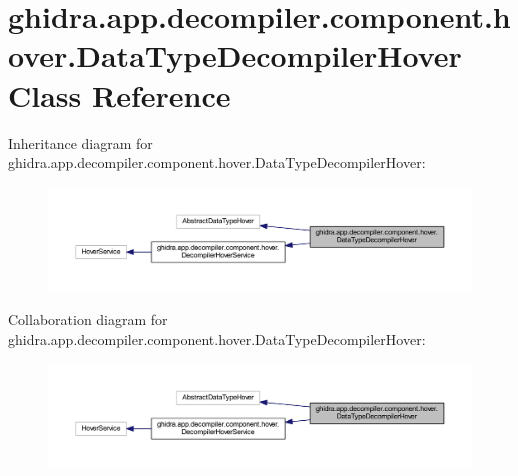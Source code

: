 \hypertarget{classghidra_1_1app_1_1decompiler_1_1component_1_1hover_1_1_data_type_decompiler_hover}{}\section{ghidra.\+app.\+decompiler.\+component.\+hover.\+Data\+Type\+Decompiler\+Hover Class Reference}
\label{classghidra_1_1app_1_1decompiler_1_1component_1_1hover_1_1_data_type_decompiler_hover}


Inheritance diagram for ghidra.\+app.\+decompiler.\+component.\+hover.\+Data\+Type\+Decompiler\+Hover\+:
\nopagebreak
\begin{figure}[H]
\begin{center}
\leavevmode
\includegraphics[width=350pt]{classghidra_1_1app_1_1decompiler_1_1component_1_1hover_1_1_data_type_decompiler_hover__inherit__graph}
\end{center}
\end{figure}


Collaboration diagram for ghidra.\+app.\+decompiler.\+component.\+hover.\+Data\+Type\+Decompiler\+Hover\+:
\nopagebreak
\begin{figure}[H]
\begin{center}
\leavevmode
\includegraphics[width=350pt]{classghidra_1_1app_1_1decompiler_1_1component_1_1hover_1_1_data_type_decompiler_hover__coll__graph}
\end{center}
\end{figure}
